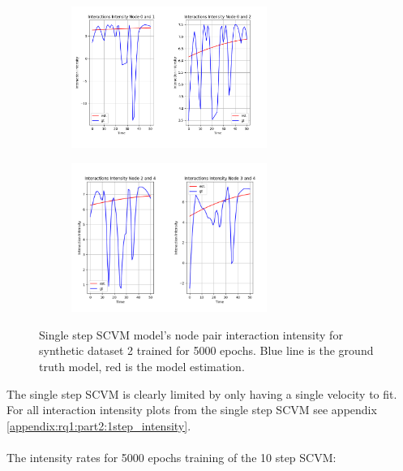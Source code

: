 \begin{figure}[H]
    \centering
    \begin{subfigure}[b]{\textwidth}
        \centering
        \includegraphics[width=0.7\textwidth]{0_images/rq1_2_1step_intensity_plot_node_01_02.PNG}
    \end{subfigure}
    \vfill
    \begin{subfigure}[b]{\textwidth}
        \centering
        \includegraphics[width=0.7\textwidth]{0_images/rq1_2_1step_intensity_plot_node_23_34.PNG}
    \end{subfigure}
    \caption{Single step SCVM model's node pair interaction intensity for synthetic dataset 2 trained for 5000 epochs. Blue line is the ground truth model, red is the model estimation.}
    \label{fig:RQ1:part2:1step_intensity}
\end{figure}
\vspace*{-0.1cm}
\noindent
The single step SCVM is clearly limited by only having a single velocity to fit.
For all interaction intensity plots from the single step SCVM  see appendix \ref{appendix:rq1:part2:1step_intensity}.
\\\\
The intensity rates for 5000 epochs training of the 10 step SCVM:
